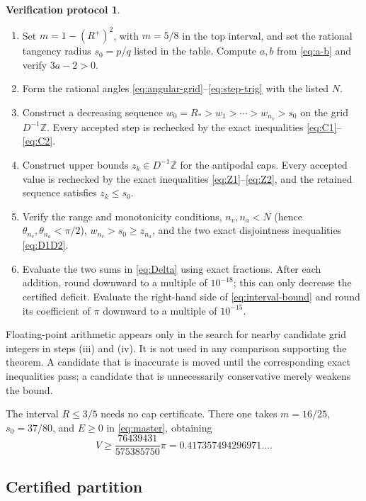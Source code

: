 \documentclass[11pt,reqno]{amsart}
\numberwithin{equation}{section}
\theoremstyle{definition}
\newtheorem{algorithm}[theorem]{Verification protocol}
\theoremstyle{remark}
\begin{document}
\begin{algorithm}\label{alg:certificate}
\leavevmode
\begin{enumerate}[label=\textup{(\roman*)}]
\item Set $m=1-(R^{+})^{2}$, with $m=5/8$ in the top interval, and set the rational tangency radius $s_0=p/q$ listed in the table. Compute $a,b$ from \eqref{eq:a-b} and verify $3a-2>0$.
\item Form the rational angles \eqref{eq:angular-grid}--\eqref{eq:step-trig} with the listed $N$.
\item Construct a decreasing sequence $w_0=R_{*}>w_1>\cdots>w_{n_v}>s_0$ on the grid $D^{-1}\mathbb Z$. Every accepted step is rechecked by the exact inequalities \eqref{eq:C1}--\eqref{eq:C2}.
\item Construct upper bounds $z_k\in D^{-1}\mathbb Z$ for the antipodal caps. Every accepted value is rechecked by the exact inequalities \eqref{eq:Z1}--\eqref{eq:Z2}, and the retained sequence satisfies $z_k\leq s_0$.
\item Verify the range and monotonicity conditions, $n_v,n_a<N$ (hence $\theta_{n_v},\theta_{n_a}<\pi/2$), $w_{n_v}>s_0\geq z_{n_a}$, and the two exact disjointness inequalities \eqref{eq:D1D2}.
\item Evaluate the two sums in \eqref{eq:Delta} using exact fractions. After each addition, round downward to a multiple of $10^{-18}$; this can only decrease the certified deficit. Evaluate the right-hand side of \eqref{eq:interval-bound} and round its coefficient of $\pi$ downward to a multiple of $10^{-15}$.
\end{enumerate}
\end{algorithm}

Floating-point arithmetic appears only in the search for nearby candidate grid integers in steps (iii) and (iv). It is not used in any comparison supporting the theorem. A candidate that is inaccurate is moved until the corresponding exact inequalities pass; a candidate that is unnecessarily conservative merely weakens the bound.

The interval $R\leq3/5$ needs no cap certificate. There one takes $m=16/25$, $s_0=37/80$, and $E\geq0$ in \eqref{eq:master}, obtaining
\begin{equation}\label{eq:case-zero}
 V\geq\frac{76439431}{575385750}\pi
 =0.417357494296971\ldots.
\end{equation}

\subsection{Certified partition}
\end{document}
